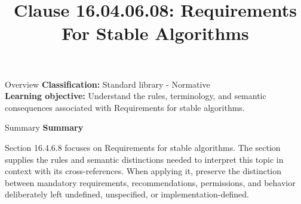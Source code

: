 \documentclass[10pt,letterpaper]{article}
\title{Clause 16.04.06.08: Requirements For Stable Algorithms}
\author{}
\date{}
\begin{document}
\maketitle
\begin{CornellOverviewBox}{Overview}
\textbf{Classification:} Standard library - Normative\\[2pt]
\textbf{Learning objective:} Understand the rules, terminology, and semantic consequences associated with Requirements for stable algorithms.
\end{CornellOverviewBox}\begin{CornellSummaryBox}{Summary}
{\sffamily\bfseries\color{Accent} Summary}\par\vspace{3pt}Section 16.4.6.8 focuses on Requirements for stable algorithms. The section supplies the rules and semantic distinctions needed to interpret this topic in context with its cross-references. When applying it, preserve the distinction between mandatory requirements, recommendations, permissions, and behavior deliberately left undefined, unspecified, or implementation-defined.
\end{CornellSummaryBox}
\end{document}
